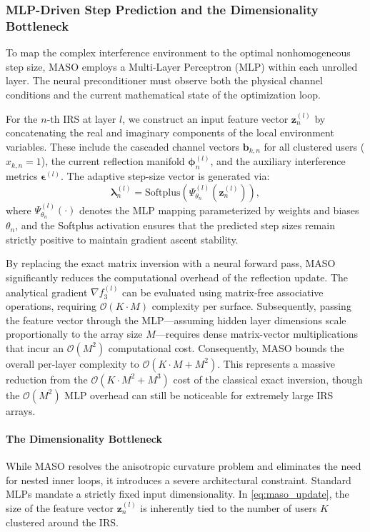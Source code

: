 \documentclass[journal]{IEEEtran}
\begin{document}
\subsubsection{MLP-Driven Step Prediction and the Dimensionality Bottleneck}
\label{subsubsec:maso_mlp}

To map the complex interference environment to the optimal nonhomogeneous step size, MASO employs a Multi-Layer Perceptron (MLP) within each unrolled layer. The neural preconditioner must observe both the physical channel conditions and the current mathematical state of the optimization loop. 

For the $n$-th IRS at layer $l$, we construct an input feature vector $\mathbf{z}_n^{(l)}$ by concatenating the real and imaginary components of the local environment variables. These include the cascaded channel vectors $\mathbf{b}_{k,n}$ for all clustered users ($x_{k,n}=1$), the current reflection manifold $\boldsymbol{\phi}_n^{(l)}$, and the auxiliary interference metrics $\boldsymbol{\epsilon}^{(l)}$. The adaptive step-size vector is generated via:
\begin{equation}
    \boldsymbol{\lambda}_n^{(l)} = \text{Softplus} \left( \Psi_{\theta_n}^{(l)} (\mathbf{z}_n^{(l)}) \right),
\end{equation}
where $\Psi_{\theta_n}^{(l)}(\cdot)$ denotes the MLP mapping parameterized by weights and biases $\theta_n$, and the Softplus activation ensures that the predicted step sizes remain strictly positive to maintain gradient ascent stability.

By replacing the exact matrix inversion with a neural forward pass, MASO significantly reduces the computational overhead of the reflection update. The analytical gradient $\nabla f_3^{(l)}$ can be evaluated using matrix-free associative operations, requiring $\mathcal{O}(K \cdot M)$ complexity per surface. Subsequently, passing the feature vector through the MLP—assuming hidden layer dimensions scale proportionally to the array size $M$—requires dense matrix-vector multiplications that incur an $\mathcal{O}(M^2)$ computational cost. Consequently, MASO bounds the overall per-layer complexity to $\mathcal{O}(K \cdot M + M^2)$. This represents a massive reduction from the $\mathcal{O}(K \cdot M^2 + M^3)$ cost of the classical exact inversion, though the $\mathcal{O}(M^2)$ MLP overhead can still be noticeable for extremely large IRS arrays.

\paragraph{The Dimensionality Bottleneck} 
While MASO resolves the anisotropic curvature problem and eliminates the need for nested inner loops, it introduces a severe architectural constraint. Standard MLPs mandate a strictly fixed input dimensionality. In \eqref{eq:maso_update}, the size of the feature vector $\mathbf{z}_n^{(l)}$ is inherently tied to the number of users $K$ clustered around the IRS. 
\end{document}
